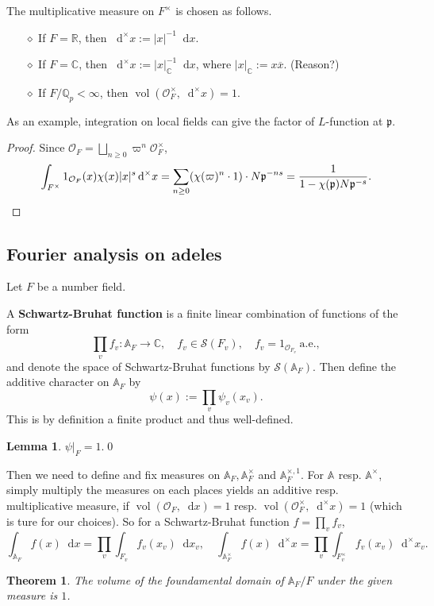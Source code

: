 \documentclass{article}
\newtheorem{theorem}{Theorem}
\theoremstyle{definition}
\newtheorem{lemma}{Lemma}[section]
\theoremstyle{remark}
\renewcommand{\bar}{\overline}
\newcommand{\R}{\mathbb{R}}
\newcommand{\C}{\mathbb{C}}
\newcommand{\Q}{\mathbb{Q}}
\newcommand{\adele}[1]{\mathbb{A}_{#1}}
\newcommand{\idele}[1]{\mathbb{A}_{#1}^{\times}}
\newcommand{\ideone}[1]{\mathbb{A}_{#1}^{\times, 1}}
\newcommand{\dx}{\mathop{}\!\mathrm{d}x}
\newcommand{\dxm}{\mathop{}\!\mathrm{d}^{\times}x}
\renewcommand{\O}{\mathcal{O}}
\DeclareMathOperator{\vol}{vol}
\newcommand{\myit}{$\diamond$}
\begin{document}
The multiplicative measure on $F^\times$ is chosen as follows.
\begin{enumerate}
    \item [\myit] If $F = \R$, then $\dxm := |x|^{-1}\dx$.
    \item [\myit] If $F = \C$, then $\dxm := |x|_\C^{-1}\dx$, where $|x|_\C := x\bar{x}$. (Reason?)
    \item [\myit] If $F/\Q_p < \infty$, then $\vol(\O^\times_F, \dxm) = 1$.
\end{enumerate}

As an example, integration on local fields can give the factor of $L$-function at $\mathfrak{p}$.
\begin{proof}
    Since $\O_F = \bigsqcup_{n\ge 0}\varpi^n\O_F^\times$, \[\int_{F^\times}1_{\O_F}(x)\chi(x)|x|^s\dxm = \sum_{n\ge 0} (\chi(\varpi)^n\cdot 1) \cdot N\mathfrak{p}^{-ns} = \frac{1}{1 - \chi(\mathfrak{p})N\mathfrak{p}^{-s}}.\qedhere\]
\end{proof}

\subsection{Fourier analysis on adeles}
Let $F$ be a number field.

A \textbf{Schwartz-Bruhat function} is a finite linear combination of functions of the form \[\prod_vf_v : \adele{F}\to\C,\quad f_v\in\mathcal{S}(F_v),\quad f_v = 1_{\O_{F_v}}\ \mathrm{a.e.},\]
and denote the space of Schwartz-Bruhat functions by $\mathcal{S}(\adele{F})$.
Then define the additive character on $\adele{F}$ by \[\psi(x) := \prod_v \psi_v(x_v).\]
This is by definition a finite product and thus well-defined.
\begin{lemma}
    $\psi|_F = 1$.\qed
\end{lemma}

Then we need to define and fix measures on $\adele{F}, \idele{F}$ and $\ideone{F}$.
For $\adele{}$ resp. $\idele{}$, simply multiply the measures on each places yields an additive resp. multiplicative measure, if $\vol(\O_F, \dx) = 1$ resp. $\vol(\O_F^\times, \dxm) = 1$ (which is ture for our choices).
So for a Schwartz-Bruhat function $f = \prod_vf_v$, \[\int_{\adele{F}} f(x)\dx = \prod_v \int_{F_v}f_v(x_v)\dx_v,\quad \int_{\idele{F}}f(x)\dxm = \prod_v \int_{F_v^\times} f_v(x_v)\dxm_v.\]
\begin{theorem}
    The volume of the foundamental domain of $\adele{F}/F$ under the given measure is $1$.
\end{theorem}
\end{document}
